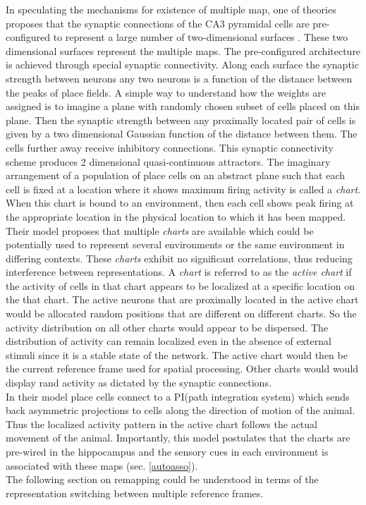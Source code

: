 In speculating the mechanisms for existence of multiple map, one of theories proposes that the synaptic connections of the CA3 pyramidal cells are pre-configured to represent a large number of two-dimensional surfaces \cite{Samsonovich1997}. These two dimensional surfaces represent the multiple maps. The pre-configured architecture is achieved through special synaptic connectivity. Along each surface the synaptic strength between neurons any two neurons is a function of the distance between the peaks of place fields.  %
A simple way to understand how the weights are assigned is to imagine a plane with randomly chosen subset of cells placed on this plane. Then the synaptic strength between any proximally located pair of cells is given by a two dimensional Gaussian function of the distance between them. The cells further away receive inhibitory connections. This synaptic connectivity scheme produces 2 dimensional quasi-continuous attractors. The imaginary arrangement of a population of place cells on an abstract plane such that each  cell is fixed at a location where it shows maximum firing activity is called a \emph{chart}. When this chart is bound to an environment, then each cell shows peak firing at the appropriate location in the physical location to which it has been mapped. Their model proposes that multiple \emph{charts} are available which could be potentially used to represent several environments or the same environment in differing contexts. These \emph{charts} exhibit no significant correlations, thus reducing  interference between representations. A \emph{chart} is referred to as the \emph{active chart} if the activity of cells in that chart appears to be localized at a specific location on the that chart. The active neurons that are proximally located in the active chart would be allocated random positions that are different on different charts. So the activity distribution on all other charts would appear to be dispersed. The distribution of activity can remain localized even in the absence of external stimuli since it is a stable state of the network. The active chart would then be the current reference frame used for spatial processing. Other charts would would display rand activity as dictated by the synaptic connections. \\
In their model place cells connect to a PI(path integration system) which sends back asymmetric projections to cells along the direction of motion of the animal. Thus the localized activity pattern in the active chart follows the actual movement of the animal. Importantly, this model postulates that the charts are pre-wired in the hippocampus and the sensory cues in each environment is associated with these maps (sec. \ref{autoasso}).\\
The following section on remapping could be understood in terms of the representation switching between multiple reference frames. 

